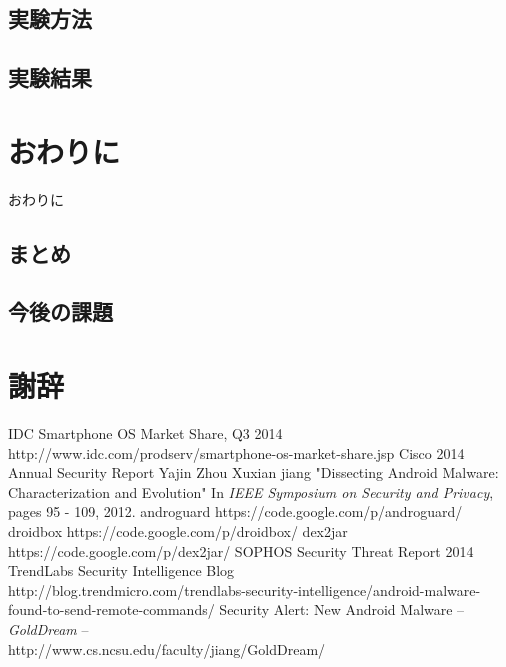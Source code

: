 \documentclass[12pt]{jsarticle}
\begin{document}
\subsection{実験方法}

\subsection{実験結果}


\newpage
\section{おわりに}
\label{sec:concl}
おわりに
\subsection{まとめ}

\subsection{今後の課題}

\newpage
\section*{謝辞}
\begin{thebibliography}{9}
	 IDC Smartphone OS Market Share, Q3 2014 \\http://www.idc.com/prodserv/smartphone-os-market-share.jsp
	 Cisco 2014 Annual Security Report
	 Yajin Zhou Xuxian jiang "Dissecting Android Malware: Characterization and Evolution" In {\it IEEE Symposium on Security and Privacy}, pages 95 - 109, 2012.
	 androguard https://code.google.com/p/androguard/
	 droidbox https://code.google.com/p/droidbox/
	 dex2jar https://code.google.com/p/dex2jar/
	 SOPHOS Security Threat Report 2014
	 TrendLabs Security Intelligence Blog\\http://blog.trendmicro.com/trendlabs-security-intelligence/android-malware-found-to-send-remote-commands/
	 Security Alert: New Android Malware -- {\it GoldDream} -- \\http://www.cs.ncsu.edu/faculty/jiang/GoldDream/
	
\end{thebibliography}
\end{document}
